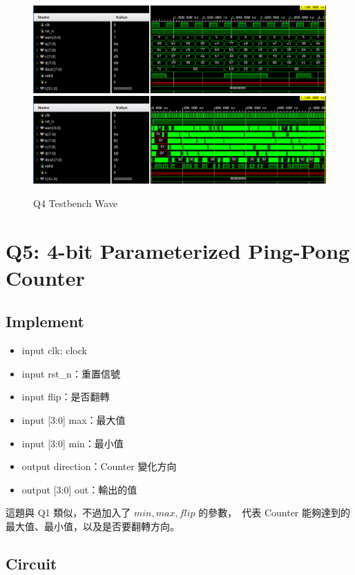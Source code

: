 \documentclass[10.5pt,compsoc,UTF8]{CjC}
\theoremstyle{mystyle}
\begin{document}
\begin{figure}[!h]
  \centering
  \includegraphics[width=\textwidth]{./img/Q4-tb-wave1.png}
  \includegraphics[width=\textwidth]{./img/Q4-tb-wave2.png}
  \caption{Q4 Testbench Wave}
  \label{fig:Q4-tb}
\end{figure}

\newpage

\section{Q5: 4-bit Parameterized Ping-Pong Counter}

\subsection{Implement}

\begin{itemize}
  \item input clk: clock
  \item input rst\_n：重置信號
  \item input flip：是否翻轉
  \item input [3:0] max：最大值
  \item input [3:0] min：最小值
  \item output direction：Counter 變化方向
  \item output [3:0] out：輸出的值
\end{itemize}

這題與 Q1 類似，不過加入了 $min, max, flip$ 的參數，\
代表 Counter 能夠達到的最大值、最小值，以及是否要翻轉方向。

\subsection{Circuit}
\end{document}
